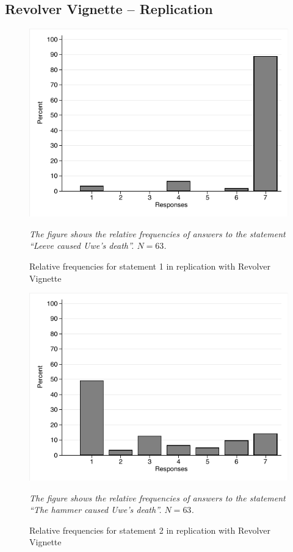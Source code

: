 \documentclass[egregdoesnotlikesansseriftitles,12pt]{scrartcl}
\begin{document}
\subsection{Revolver Vignette -- Replication}
\begin{figure}[H]
   \centering
   \includegraphics[scale=0.8]{figures/rev_rep_hist_1.pdf}
   \begin{minipage}{0.9\linewidth}
   \footnotesize
   \emph{The figure shows the relative frequencies of answers to the statement ``Leeve caused Uwe's death''. $N=63$.}
   \end{minipage}
   \caption{Relative frequencies for statement 1 in replication with Revolver Vignette}
   \label{fig:rev_rep_hist_1}
\end{figure}

\begin{figure}[H]
   \centering
   \includegraphics[scale=0.8]{figures/rev_rep_hist_2.pdf}
   \begin{minipage}{0.9\linewidth}
   \footnotesize
   \emph{The figure shows the relative frequencies of answers to the statement ``The hammer caused Uwe's death''. $N=63$.}
   \end{minipage}
   \caption{Relative frequencies for statement 2 in replication with Revolver Vignette}
   \label{fig:rev_rep_hist_2}
\end{figure}
\end{document}
